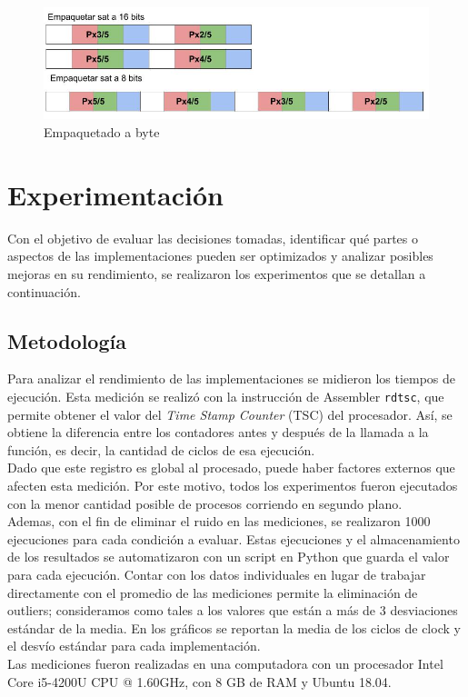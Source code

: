 \documentclass[a4paper]{article}
\begin{document}
\begin{figure}[!htb]
  \begin{center}
	\includegraphics[scale=0.4]{img/zigzag/FilasPares4.jpg}
	\caption{Empaquetado a byte}
  \end{center}
\end{figure}


\section{Experimentación}

Con el objetivo de evaluar las decisiones tomadas, identificar qué partes o aspectos de las implementaciones pueden ser optimizados y analizar posibles mejoras en su rendimiento, se realizaron los experimentos que se detallan a continuación.

\subsection{Metodología}
Para analizar el rendimiento de las implementaciones se midieron los tiempos de ejecución. Esta medición se realizó con la instrucción de Assembler {\tt rdtsc}, que permite obtener el valor del \textit{Time Stamp Counter} (TSC) del procesador. Así, se obtiene la diferencia entre los contadores antes y después de la llamada a la función, es decir, la cantidad de ciclos de esa ejecución. \\
Dado que este registro es global al procesado, puede haber factores externos que afecten esta medición. Por este motivo, todos los experimentos fueron ejecutados con la menor cantidad posible de procesos corriendo en segundo plano. \\
Ademas, con el fin de eliminar el ruido en las mediciones, se realizaron 1000 ejecuciones para cada condición a evaluar. Estas ejecuciones y el almacenamiento de los resultados se automatizaron con un script en Python que guarda el valor para cada ejecución. Contar con los datos individuales en lugar de trabajar directamente con el promedio de las mediciones permite la eliminación de outliers; consideramos como tales a los valores que están a más de 3 desviaciones estándar de la media. En los gráficos se reportan la media de los ciclos de clock y el desvío estándar para cada implementación. \\
Las mediciones fueron realizadas en una computadora con un procesador Intel Core i5-4200U CPU @ 1.60GHz, con 8 GB de RAM y Ubuntu 18.04.
\end{document}

